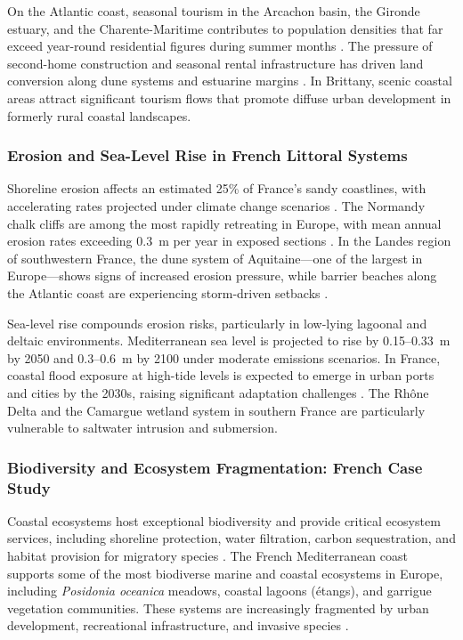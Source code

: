 \documentclass[coasts,article,accept,pdftex,moreauthors]{Definitions/mdpi}
\begin{document}
On the Atlantic coast, seasonal tourism in the Arcachon basin, the Gironde estuary, and the Charente-Maritime contributes to population densities that far exceed year-round residential figures during summer months \citep{blondy2016residences,observatoire2024charente}. The pressure of second-home construction and seasonal rental infrastructure has driven land conversion along dune systems and estuarine margins \citep{paskoff1988touristic,blondy2018secondhomes}. In Brittany, scenic coastal areas attract significant tourism flows that promote diffuse urban development in formerly rural coastal landscapes.

\subsubsection{Erosion and Sea-Level Rise in French Littoral Systems}

Shoreline erosion affects an estimated 25\% of France's sandy coastlines, with accelerating rates projected under climate change scenarios \citep{euroion2004,meur-ferec2011}. The Normandy chalk cliffs are among the most rapidly retreating in Europe, with mean annual erosion rates exceeding 0.3~m per year in exposed sections \citep{costa2004falaises}. In the Landes region of southwestern France, the dune system of Aquitaine—one of the largest in Europe—shows signs of increased erosion pressure, while barrier beaches along the Atlantic coast are experiencing storm-driven setbacks \citep{castelle2018aquitaine,chaumillon2017storms}.

Sea-level rise compounds erosion risks, particularly in low-lying lagoonal and deltaic environments. Mediterranean sea level is projected to rise by 0.15–0.33~m by 2050 and 0.3–0.6~m by 2100 under moderate emissions scenarios. In France, coastal flood exposure at high-tide levels is expected to emerge in urban ports and cities by the 2030s, raising significant adaptation challenges \citep{LeCozannet2024}. The Rhône Delta and the Camargue wetland system in southern France are particularly vulnerable to saltwater intrusion and submersion.

\subsubsection{Biodiversity and Ecosystem Fragmentation: French Case Study}

Coastal ecosystems host exceptional biodiversity and provide critical ecosystem services, including shoreline protection, water filtration, carbon sequestration, and habitat provision for migratory species \citep{Sanchez2015}. The French Mediterranean coast supports some of the most biodiverse marine and coastal ecosystems in Europe, including \textit{Posidonia oceanica} meadows, coastal lagoons (étangs), and garrigue vegetation communities. These systems are increasingly fragmented by urban development, recreational infrastructure, and invasive species \citep{IPCC2022med}.
\end{document}

